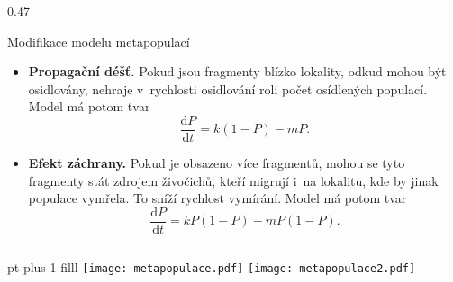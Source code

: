 \documentclass[handouts]{beamer}
\begin{document}
\begin{frame}
\begin{columns}
\begin{column}{0.47\hsize}
\begin{block}{Modifikace modelu metapopulací}
\begin{itemize}
\item \textbf{Propagační déšť.} Pokud jsou fragmenty blízko lokality, odkud mohou být osidlovány, nehraje v rychlosti osidlování roli počet osídlených populací. Model má potom tvar $$\frac{\mathrm dP}{\mathrm dt}=k (1-P) - mP.$$
\item \textbf{Efekt záchrany.} Pokud je obsazeno více fragmentů, mohou se tyto fragmenty stát zdrojem živočichů, kteří migrují i na lokalitu, kde by jinak populace vymřela. To sníží rychlost vymírání. Model má potom tvar
  $$\frac{\mathrm dP}{\mathrm dt}=k P (1-P) - mP(1-P).$$
\end{itemize}
\end{block}
\end{column}

\end{columns}
 pt plus 1 filll
\texttt{[image: metapopulace.pdf]}%
\texttt{[image: metapopulace2.pdf]}

\end{frame}
\end{document}

